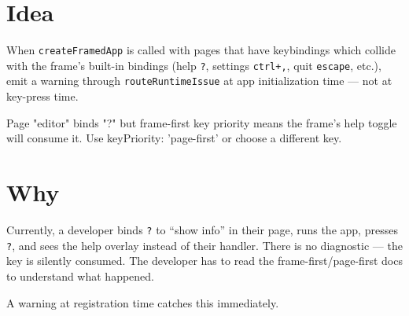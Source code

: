\section{Idea}\label{record-343-idea}

When \texttt{c\allowbreak{}r\allowbreak{}e\allowbreak{}a\allowbreak{}t\allowbreak{}e\allowbreak{}F\allowbreak{}r\allowbreak{}a\allowbreak{}m\allowbreak{}e\allowbreak{}d\allowbreak{}A\allowbreak{}p\allowbreak{}p} is called with pages that have keybindings which collide with the frame's built-in bindings (help \texttt{?}, settings \texttt{c\allowbreak{}t\allowbreak{}r\allowbreak{}l\allowbreak{}+\allowbreak{},}, quit \texttt{e\allowbreak{}s\allowbreak{}c\allowbreak{}a\allowbreak{}p\allowbreak{}e}, etc.), emit a warning through \texttt{r\allowbreak{}o\allowbreak{}u\allowbreak{}t\allowbreak{}e\allowbreak{}R\allowbreak{}u\allowbreak{}n\allowbreak{}t\allowbreak{}i\allowbreak{}m\allowbreak{}e\allowbreak{}I\allowbreak{}s\allowbreak{}s\allowbreak{}u\allowbreak{}e} at app initialization time --- not at key-press time.

\begin{CodeBlock}
 Page "editor" binds "?" but frame-first key
priority means the frame's help toggle will consume it. Use
keyPriority: 'page-first' or choose a different key.
\end{CodeBlock}

\section{Why}\label{record-343-why}

Currently, a developer binds \texttt{?} to ``show info'' in their page, runs the app, presses \texttt{?}, and sees the help overlay instead of their handler. There is no diagnostic --- the key is silently consumed. The developer has to read the frame-first/page-first docs to understand what happened.

A warning at registration time catches this immediately.

